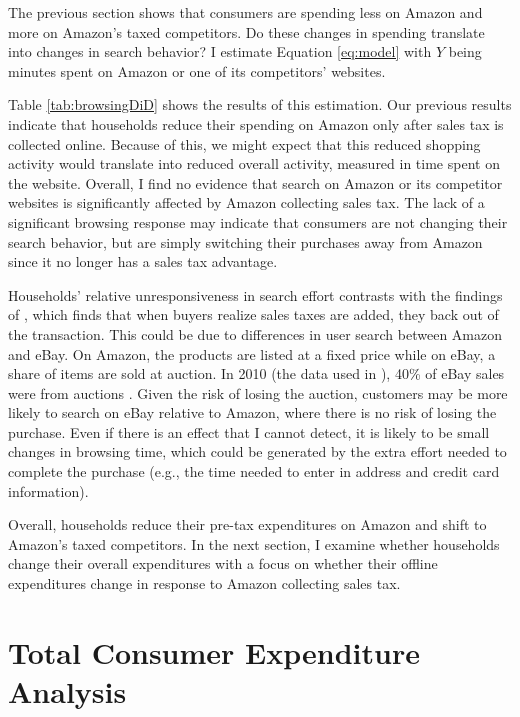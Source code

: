 \documentclass[AEJ,reviewmode]{AEA}
\begin{document}
The previous section shows that consumers are spending less on Amazon and more on Amazon's taxed competitors. Do these changes in spending translate into changes in search behavior? I estimate Equation \ref{eq:model} with $Y$ being minutes spent on Amazon or one of its competitors' websites.



Table \ref{tab:browsingDiD} shows the results of this estimation. Our previous results indicate that households reduce their spending on Amazon only after sales tax is collected online. Because of this, we might expect that this reduced shopping activity would translate into reduced overall activity, measured in time spent on the website. Overall, I find no evidence that search on Amazon or its competitor websites is significantly affected by Amazon collecting sales tax. The lack of a significant browsing response may indicate that consumers are not changing their search behavior, but are simply switching their purchases away from Amazon since it no longer has a sales tax advantage.

Households' relative unresponsiveness in search effort contrasts with the findings of \citet{einavEtAl2014}, which finds that when buyers realize sales taxes are added, they back out of the transaction. This could be due to differences in user search between Amazon and eBay. On Amazon, the products are listed at a fixed price while on eBay, a share of items are sold at auction. In 2010 (the data used in \citet{einavEtAl2014}), 40\% of eBay sales were from auctions \citep{ebay2011}. Given the risk of losing the auction, customers may be more likely to search on eBay relative to Amazon, where there is no risk of losing the purchase. Even if there is an effect that I cannot detect, it is likely to be small changes in browsing time, which could be generated by the extra effort needed to complete the purchase (e.g., the time needed to enter in address and credit card information).

Overall, households reduce their pre-tax expenditures on Amazon and shift to Amazon's taxed competitors. In the next section, I examine whether households change their overall expenditures with a focus on whether their offline expenditures change in response to Amazon collecting sales tax.

\section{Total Consumer Expenditure Analysis}
\label{sec:nielsen}
\end{document}
